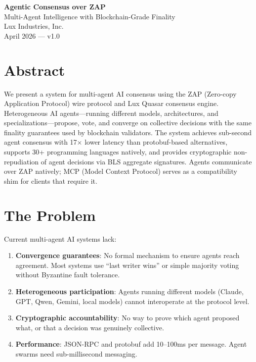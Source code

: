 \documentclass[11pt,a4paper]{article}
\begin{document}
\begin{center}
{\LARGE\bfseries Agentic Consensus over ZAP}\\[0.5em]
{\Large Multi-Agent Intelligence with Blockchain-Grade Finality}\\[1em]
{\large Lux Industries, Inc.}\\[0.5em]
{\normalsize April 2026 --- v1.0}
\end{center}

\section*{Abstract}

We present a system for multi-agent AI consensus using the ZAP (Zero-copy Application Protocol) wire protocol and Lux Quasar consensus engine. Heterogeneous AI agents---running different models, architectures, and specializations---propose, vote, and converge on collective decisions with the same finality guarantees used by blockchain validators. The system achieves sub-second agent consensus with 17$\times$ lower latency than protobuf-based alternatives, supports 30+ programming languages natively, and provides cryptographic non-repudiation of agent decisions via BLS aggregate signatures. Agents communicate over ZAP natively; MCP (Model Context Protocol) serves as a compatibility shim for clients that require it.

\section{The Problem}

Current multi-agent AI systems lack:

\begin{enumerate}[leftmargin=2em]
\item \textbf{Convergence guarantees}: No formal mechanism to ensure agents reach agreement. Most systems use ``last writer wins'' or simple majority voting without Byzantine fault tolerance.
\item \textbf{Heterogeneous participation}: Agents running different models (Claude, GPT, Qwen, Gemini, local models) cannot interoperate at the protocol level.
\item \textbf{Cryptographic accountability}: No way to prove which agent proposed what, or that a decision was genuinely collective.
\item \textbf{Performance}: JSON-RPC and protobuf add 10--100ms per message. Agent swarms need sub-millisecond messaging.
\end{enumerate}
\end{document}

